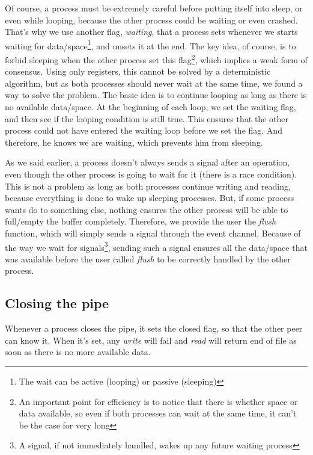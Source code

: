 \documentclass[journal]{IEEEtran}
\begin{document}
Of course, a process must be extremely careful before putting itself into sleep, or even while looping, because the other process could be waiting or even crashed. That's why we use another flag, \emph{waiting}, that a process sets whenever we starts waiting for data/space\footnote{The wait can be active (looping) or passive (sleeping)}, and unsets it at the end. The key idea, of course, is to forbid sleeping when the other process set this flag\footnote{An important point for efficiency is to notice that there is whether space or data available, so even if both processes can wait at the same time, it can't be the case for very long}, which implies a weak form of consensus.
Using only registers, this cannot be solved by a deterministic algorithm, but as both processes should never wait at the same time, we found a way to solve the problem. The basic idea is to continue looping as long as there is no available data/space. At the beginning of each loop, we set the waiting flag, and then see if the looping condition is still true.
This ensures that the other process could not have entered the waiting loop before we set the flag. And therefore, he knows we are waiting, which prevents him from sleeping.

As we said earlier, a process doesn't always sends a signal after an operation, even though the other process is going to wait for it (there is a race condition). This is not a problem as long as both processes continue writing and reading, because everything is done to wake up sleeping processes. But, if some process wants do to something else, nothing ensures the other process will be able to full/empty the buffer completely. Therefore, we provide the user the \emph{flush} function, which will simply sends a signal through the event channel. Because of the way we wait for signals\footnote{A signal, if not immediately handled, wakes up any future waiting process}, sending such a signal ensures all the data/space that was available before the user called \emph{flush} to be correctly handled by the other process. 

\subsection{Closing the pipe}

Whenever a process closes the pipe, it sets the closed flag, so that the other peer can know it. When it's set, any \emph{write} will fail and \emph{read} will return end of file as soon as there is no more available data.  
\end{document}
